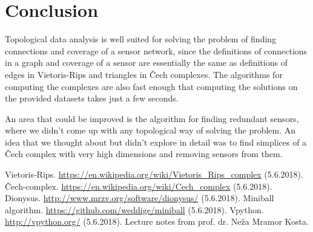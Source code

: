\documentclass[a4paper, 12pt]{article}
\begin{document}
\section{Conclusion}

Topological data analysis is well suited for solving the problem of finding connections and coverage of a sensor network, since the definitions of connections in a graph and coverage of a sensor are essentially the same as definitions of edges in Vietoris-Rips and triangles in Čech complexes. The algorithms for computing the complexes are also fast enough that computing the solutions on the provided datasets takes just a few seconds.

An area that could be improved is the algorithm for finding redundant sensors, where we didn't come up with any topological way of solving the problem. An idea that we thought about but didn't explore in detail was to find simplices of a Čech complex with very high dimensions and removing sensors from them.




\begin{thebibliography}{99}
	\bibitem{} Vietoris-Rips. \url{https://en.wikipedia.org/wiki/Vietoris_Rips_complex} (5.6.2018).
	Čech-complex. \url{https://en.wikipedia.org/wiki/Cech_complex} (5.6.2018).
	Dionysus. \url{http://www.mrzv.org/software/dionysus/} (5.6.2018).
	Miniball algorithm. \url{https://github.com/weddige/miniball} (5.6.2018).
	Vpython. \url{http://vpython.org/} (5.6.2018).
	 Lecture notes from prof. dr. Neža Mramor Kosta.
\end{thebibliography}
\end{document}

